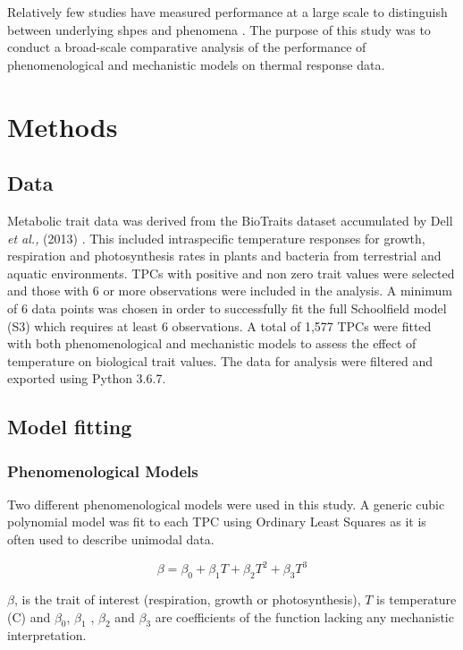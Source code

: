 \documentclass[11pt]{article}
\begin{document}
\begin{linenumbers}
 Relatively few studies have measured performance at a large scale to distinguish between underlying shpes and phenomena \cite{pub.1026914980} \cite{Dowd1956}. The purpose of this study was to conduct a broad-scale comparative analysis of the performance of phenomenological and mechanistic models on thermal response data.

 \section{Methods}
 \subsection{Data}
 Metabolic trait data was derived from the BioTraits dataset accumulated by Dell \textit{et al.,} (2013) . This included intraspecific temperature responses for growth, respiration and photosynthesis rates in plants and bacteria from terrestrial and aquatic environments. 
 TPCs with positive and non zero trait values were selected and those with 6 or more observations were included in the analysis. A minimum of 6 data points was chosen in order to successfully fit the full Schoolfield model (S3) which requires at least 6 observations. A total of 1,577 TPCs were fitted with both phenomenological and mechanistic models to assess the effect of temperature on biological trait values. The data for analysis were filtered and exported using Python 3.6.7.
 
 \subsection{Model fitting}
  \subsubsection{Phenomenological Models}
Two different phenomenological models were used in this study. A generic cubic polynomial model was fit to each TPC using Ordinary Least Squares as it is often used to describe unimodal data. 

\begin{equation}
\beta = \beta_0 + \beta_1 T + \beta_2 T^2 + \beta_3 T^3\tag{1}
\end{equation}

\(\beta\), is the trait of interest (respiration, growth or photosynthesis), \(T\) is temperature (\degree C) and \(\beta_0\), \(\beta_1\) , \(\beta_2\)  and \(\beta_3\) are coefficients of the function lacking any mechanistic interpretation.  


\end{linenumbers}
\end{document}

